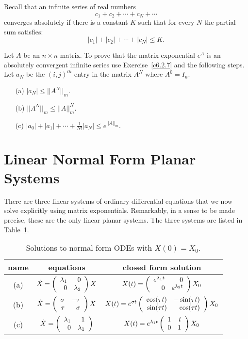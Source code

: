 \begin{exercise} \label{c6.2.8}
Recall that an infinite series of real numbers
\[
c_1+c_2 +\cdots+c_N + \cdots
\]
converges absolutely if there is a constant $K$ such that for every $N$
the partial sum satisfies:
\[
|c_1| + |c_2| + \cdots + |c_N| \leq K.
\]

Let $A$ be an $n\times n$ matrix.  To prove that the matrix exponential $e^A$
is an absolutely convergent infinite series use Exercise~\ref{c6.2.7} and the
following steps.  Let $a_N$ be the $(i,j)^{th}$ entry in the matrix $A^N$
where $A^0=I_n$.
\begin{itemize}
\item[(a)]  $|a_N| \leq ||A^N||_m$.
\item[(b)]  $||A^N||_m \leq ||A||_m^N$.
\item[(c)]  $|a_0| + |a_1| + \cdots + \frac{1}{N!}|a_N| \leq e^{||A||_m}$.
\end{itemize}
\end{exercise}


\section{Linear Normal Form Planar Systems} 
\label{S:LNFPS}

There are three linear systems of ordinary differential equations
that we now solve explicitly using matrix exponentials.  Remarkably,
in a sense to be made precise, these are the only linear planar systems.
The three systems are listed in Table~\ref{T:3sys}.


\begin{table}[htb]
\begin{center}
\begin{tabular}{|c|c|c|}
\hline
name  & equations & closed form solution \\
\hline
(a) & $\dot{X} = \left(\begin{array}{rr} \lambda_1 & 0\\ 0 &\lambda_2\end{array}\right) X$ &
$X(t) = \left(\begin{array}{rr} e^{\lambda_1 t} & 0\\ 0 &e^{\lambda_2 t}\end{array}\right)X_0$ \\
\hline
(b) & $\dot{X}=\left(\begin{array}{rr} \sigma & -\tau\\ \tau &\sigma\end{array}\right)X$ & $X(t) = e^{\sigma t}
\left(\begin{array}{rr} \cos(\tau t) & -\sin(\tau t)\\ \sin(\tau t) &\cos(\tau t)\end{array}\right)X_0$\\
\hline
(c) & $\dot{X} = \left(\begin{array}{rr} \lambda_1 & 1\\ 0 &\lambda_1\end{array}\right)$ &
$X(t) = e^{\lambda_1 t}\left(\begin{array}{rr} 1 & t\\ 0 &1\end{array}\right)X_0$ \\
\hline
\end{tabular}
\caption{Solutions to normal form ODEs with $X(0)=X_0$.}
\label{T:3sys}
\end{center}
\end{table}

